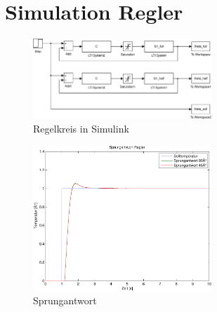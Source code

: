 \section{Simulation Regler}
\begin{figure}[h!]
    \centering
    \includegraphics[width=0.6\textwidth]{08/saturation_mdl.pdf}
    \caption{Regelkreis in Simulink}
    \label{fig:08simulink}
\end{figure}
\begin{figure}[h!]
    \centering
    \includegraphics[width=0.6\textwidth]{08/saturation_plot.pdf}
    \caption{Sprungantwort}
    \label{fig:08simulink}
\end{figure}

